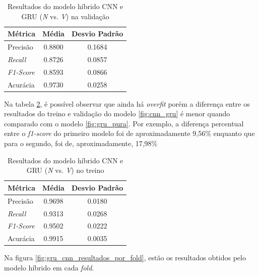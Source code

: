 \begin{table}[H]
\centering
\caption{Resultados do modelo híbrido CNN e GRU (\textit{N} vs. \textit{V}) na validação}
\label{tab:resultado_cv_gru_cnn_validacao}
\begin{tabular}{lcc}
\hline
\textbf{Métrica} & \textbf{Média} & \textbf{Desvio Padrão} \\
\hline
Precisão & 0.8800 &  0.1684 \\
\textit{Recall} & 0.8726  & 0.0857 \\
\textit{F1-Score} & 0.8593 & 0.0866 \\
Acurácia & 0.9730 & 0.0258 \\
\hline
\end{tabular}
\end{table}

Na tabela  \ref{tab:resultado_cv_gru_cnn_treino}, é possível observar que ainda há \textit{overfit} porém a diferença entre os resultados
do treino e validação do modelo \ref{fig:cnn_gru} é menor quando comparado com o modelo \ref{fig:gru_pura}. Por exemplo, a 
diferença percentual entre o \textit{f1-score} do primeiro modelo foi de aproximadamente 9,56\% enquanto que para o segundo, foi de, aproximadamente, 17,98\%

\begin{table}[H]
\centering
\caption{Resultados do modelo híbrido CNN e GRU (\textit{N} vs. \textit{V}) no treino}
\label{tab:resultado_cv_gru_cnn_treino}
\begin{tabular}{lcc}
\hline
\textbf{Métrica} & \textbf{Média} & \textbf{Desvio Padrão} \\
\hline
Precisão & 0.9698 &  0.0180 \\
\textit{Recall} & 0.9313  & 0.0268 \\
\textit{F1-Score} & 0.9502 & 0.0222\\
Acurácia & 0.9915 & 0.0035 \\
\hline
\end{tabular}
\end{table}

Na figura \ref{fig:gru_cnn_resultados_por_fold}, estão os resultados obtidos pelo modelo híbrido em cada \textit{fold}.

